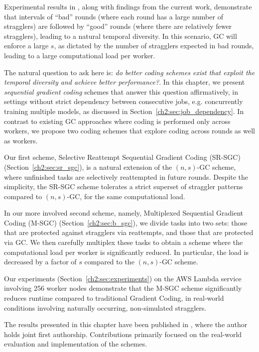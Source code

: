 Experimental results in \cite{timelycodedcomputing}, along with findings from the current work, demonstrate that intervals of “bad” rounds (where each round has a large number of stragglers) are followed by  “good” rounds (where there are relatively fewer stragglers), leading to a natural temporal diversity. In this scenario, GC will enforce a large $s$, as dictated by the number of stragglers expected in bad rounds, leading to a large computational load per worker. 

The natural question to ask here is: \textit{do better coding schemes exist that exploit the temporal diversity and achieve better performance?}. In this chapter, we present \textit{sequential gradient coding} schemes that answer this question affirmatively, in settings without strict dependency between consecutive jobs, e.g. concurrently training multiple models, as discussed in Section~\ref{ch2:sec:job_dependency}. In contrast to existing GC approaches where coding is performed only across workers, we propose two coding schemes that explore coding across rounds as well as workers.

Our first scheme, Selective Reattempt Sequential Gradient Coding (SR-SGC) (Section~\ref{ch2:sec:sr_sgc}), is a natural extension of the $(n,s)$-GC scheme, where unfinished tasks are selectively reattempted in future rounds. Despite the simplicity, the SR-SGC scheme tolerates a strict superset of straggler patterns compared to $(n,s)$-GC, for the same computational load.

In our more involved second scheme, namely, Multiplexed Sequential Gradient Coding (M-SGC) (Section~\ref{ch2:sec:b_sgc}), we divide tasks into two sets: those that are protected against stragglers via reattempts, and those that are protected via GC. We then carefully multiplex these tasks to obtain a scheme where the computational load per worker is significantly reduced. In particular, the load is decreased by a factor of $s$ compared to the $(n,s)$-GC scheme. 

Our experiments (Section~\ref{ch2:sec:experiments}) on the AWS Lambda service involving 256 worker nodes demonstrate that the M-SGC scheme significantly reduces runtime compared to traditional Gradient Coding, in real-world conditions involving naturally occurring, non-simulated stragglers. 

The results presented in this chapter have been published in \cite{krishnan2023sequential}, where the author holds joint first authorship. Contributions primarily focused on the real-world evaluation and implementation of the schemes.



